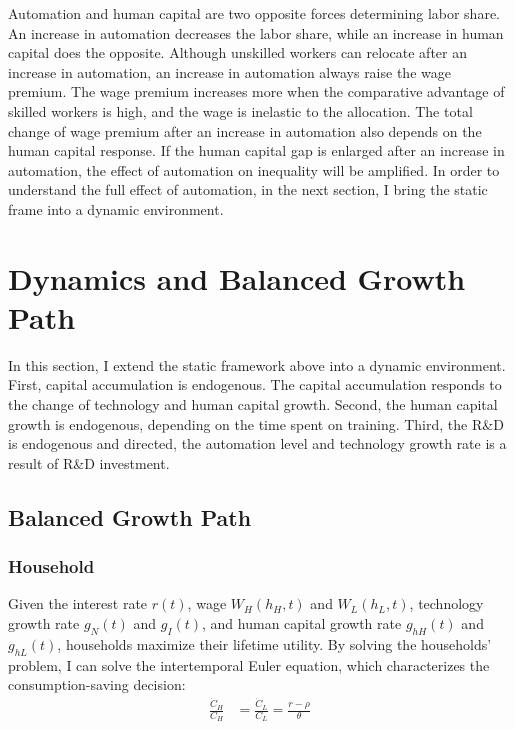 \documentclass[12pt]{article}
\begin{document}
Automation and human capital are two opposite forces determining labor share. An increase in automation decreases the labor share, while an increase in human capital does the opposite. Although unskilled workers can relocate after an increase in automation, an increase in automation always raise the wage premium. The wage premium increases more when the comparative advantage of skilled workers is high, and the wage is inelastic to the allocation. The total change of wage premium after an increase in automation also depends on the human capital response. If the human capital gap is enlarged after an increase in automation, the effect of automation on inequality will be amplified. In order to understand the full effect of automation, in the next section, I bring the static frame into a dynamic environment. 


\section{Dynamics and Balanced Growth Path}
In this section, I extend the static framework above into a dynamic environment. First, capital accumulation is endogenous. The capital accumulation responds to the change of technology and human capital growth. Second, the human capital growth is endogenous, depending on the time spent on training. Third, the R\&D is endogenous and directed, the automation level and technology growth rate is a result of R\&D investment.

\subsection{Balanced Growth Path}
\subsubsection*{Household}
Given the interest rate $r(t)$, wage $W_H(h_H,t)$ and $W_L(h_L,t)$, technology growth rate $g_N(t)$ and $g_I(t)$, and human capital growth rate $g_{hH}(t)$ and  $g_{hL}(t)$, households maximize their lifetime utility. By solving the households' problem, I can solve the intertemporal Euler equation, which characterizes the consumption-saving decision: 
\begin{align*}
\frac{\dot{C}_H}{C_H} &= \frac{\dot{C}_L}{C_L}  = \frac{r-\rho}{\theta} 
\end{align*}
\end{document}
